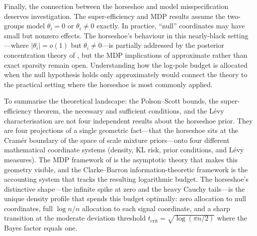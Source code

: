 \documentclass[12pt]{article}
\newcommand{\abs}[1]{\lvert #1 \rvert}
\newcommand{\tcrit}{t_{\mathrm{crit}}}
\begin{document}
Finally, the connection between the horseshoe and model misspecification deserves investigation. The super-efficiency and MDP results assume the two-groups model $\theta_i = 0$ or $\theta_i \neq 0$ exactly. In practice, ``null'' coordinates may have small but nonzero effects. The horseshoe's behaviour in this nearly-black setting---where $\abs{\theta_i} = o(1)$ but $\theta_i \neq 0$---is partially addressed by the posterior concentration theory of \citet{vanderpas2014horseshoe}, but the MDP implications of approximate rather than exact sparsity remain open. Understanding how the log-pole budget is allocated when the null hypothesis holds only approximately would connect the theory to the practical setting where the horseshoe is most commonly applied.

To summarise the theoretical landscape: the Polson--Scott bounds, the super-efficiency theorem, the necessary and sufficient conditions, and the L\'evy characterisation are not four independent results about the horseshoe prior. They are four projections of a single geometric fact---that the horseshoe sits at the Cram\'er boundary of the space of scale mixture priors---onto four different mathematical coordinate systems (density, KL risk, prior conditions, and L\'evy measures). The MDP framework of \citet{datta2026newlook} is the asymptotic theory that makes this geometry visible, and the Clarke--Barron information-theoretic framework is the accounting system that tracks the resulting logarithmic budget. The horseshoe's distinctive shape---the infinite spike at zero and the heavy Cauchy tails---is the unique density profile that spends this budget optimally: zero allocation to null coordinates, full $\log n / n$ allocation to each signal coordinate, and a sharp transition at the moderate deviation threshold $\tcrit = \sqrt{\log(\pi n/2)}$ where the Bayes factor equals one.




\end{document}
